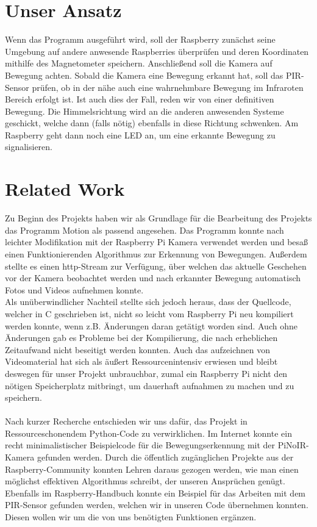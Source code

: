 \documentclass[journal]{IEEEtran}
\begin{document}
\section{Unser Ansatz}
Wenn das Programm ausgeführt wird, soll der Raspberry zunächst seine Umgebung auf andere anwesende Raspberries überprüfen und deren Koordinaten mithilfe des Magnetometer speichern. 
Anschließend soll die Kamera auf Bewegung achten. 
Sobald die Kamera eine Bewegung erkannt hat, soll das PIR-Sensor prüfen, ob in der nähe auch eine wahrnehmbare Bewegung im Infraroten Bereich erfolgt ist. 
Ist auch dies der Fall, reden wir von einer definitiven Bewegung. 
Die Himmelsrichtung wird an die anderen anwesenden Systeme geschickt, welche dann (falls nötig) ebenfalls in diese Richtung schwenken. 
Am Raspberry geht dann noch eine LED an, um eine erkannte Bewegung zu signalisieren. 

\section{Related Work} 
Zu Beginn des Projekts haben wir als Grundlage für die Bearbeitung des Projekts das Programm Motion\cite{motion} als passend angesehen. 
Das Programm konnte nach leichter Modifikation mit der Raspberry Pi Kamera verwendet werden und besaß einen Funktionierenden Algorithmus zur Erkennung von Bewegungen. 
Außerdem stellte es einen http-Stream zur Verfügung, über welchen das aktuelle Geschehen vor der Kamera beobachtet werden und nach erkannter Bewegung automatisch Fotos und Videos aufnehmen konnte. 
\\ 
Als unüberwindlicher Nachteil stellte sich jedoch heraus, dass der Quellcode, welcher in C geschrieben ist, nicht so leicht vom Raspberry Pi neu kompiliert werden konnte, wenn z.B. Änderungen daran getätigt worden sind. 
Auch ohne Änderungen gab es Probleme bei der Kompilierung, die nach erheblichen Zeitaufwand nicht beseitigt werden konnten. 
Auch das aufzeichnen von Videomaterial hat sich als äußert Ressourcenintensiv erwiesen und bleibt deswegen für unser Projekt unbrauchbar, zumal ein Raspberry Pi nicht den nötigen Speicherplatz mitbringt, um dauerhaft aufnahmen zu machen und zu speichern.
\\ \\
Nach kurzer Recherche entschieden wir uns dafür, das Projekt in Ressourceschonendem Python-Code zu verwirklichen.
Im Internet konnte ein recht minimalistischer Beispielcode für die Bewegungserkennung mit der PiNoIR-Kamera gefunden werden\cite{motioncode}.
Durch die öffentlich zugänglichen Projekte aus der Raspberry-Community konnten Lehren daraus gezogen werden, wie man einen möglichst effektiven Algorithmus schreibt, der unseren Ansprüchen genügt. 
Ebenfalls im Raspberry-Handbuch konnte ein Beispiel für das Arbeiten mit dem PIR-Sensor gefunden werden\cite[S. 495]{Raspi}, welchen wir in unseren Code übernehmen konnten.
Diesen wollen wir um die von uns benötigten Funktionen ergänzen.
\end{document}
